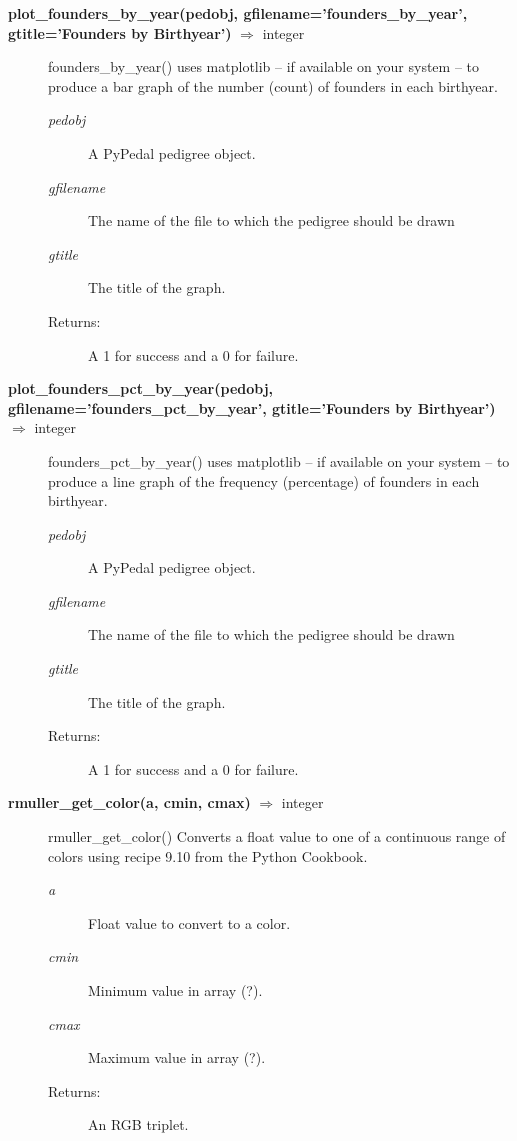 \begin{description}
\item[\textbf{plot\_founders\_by\_year(pedobj, gfilename='founders\_by\_year', gtitle='Founders by Birthyear')} $\Rightarrow$ integer]
founders\_by\_year() uses matplotlib -- if available on your system -- to produce a bar graph of the number (count) of founders in each birthyear.
\begin{description}
\item[\emph{pedobj}] A PyPedal pedigree object.
\item[\emph{gfilename}] The name of the file to which the pedigree should be drawn
\item[\emph{gtitle}] The title of the graph.
\item[Returns:] A 1 for success and a 0 for failure.
\end{description}

\item[\textbf{plot\_founders\_pct\_by\_year(pedobj, gfilename='founders\_pct\_by\_year', gtitle='Founders by Birthyear')} $\Rightarrow$ integer]
founders\_pct\_by\_year() uses matplotlib -- if available on your system -- to produce a line graph of the frequency (percentage) of founders in each birthyear.
\begin{description}
\item[\emph{pedobj}] A PyPedal pedigree object.
\item[\emph{gfilename}] The name of the file to which the pedigree should be drawn
\item[\emph{gtitle}] The title of the graph.
\item[Returns:] A 1 for success and a 0 for failure.
\end{description}

\item[\textbf{rmuller\_get\_color(a, cmin, cmax)} $\Rightarrow$ integer]
rmuller\_get\_color() Converts a float value to one of a continuous range of colors using recipe 9.10 from the Python Cookbook.
\begin{description}
\item[\emph{a}] Float value to convert to a color.
\item[\emph{cmin}] Minimum value in array (?).
\item[\emph{cmax}] Maximum value in array (?).
\item[Returns:] An RGB triplet.
\end{description}


\end{description}
